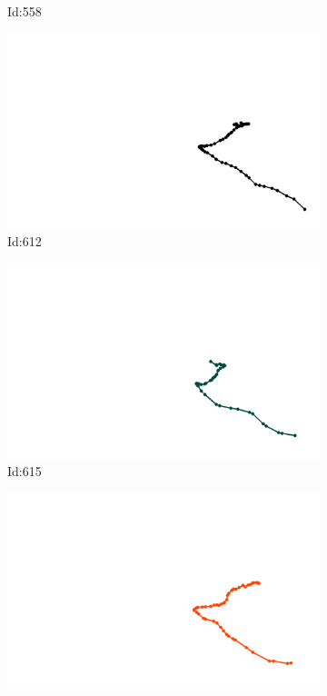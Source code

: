 \documentclass[12pt,twoside]{report}
\begin{document}
\begin{figure}
\begin{subfigure}[b]{0.20\textwidth}
\caption{Id:558}
\end{subfigure}
\begin{subfigure}[b]{0.20\textwidth}
\centering
\includegraphics[width=\textwidth]{../trajectories/612.png}
\caption{Id:612}
\end{subfigure}
\begin{subfigure}[b]{0.20\textwidth}
\centering
\includegraphics[width=\textwidth]{../trajectories/615.png}
\caption{Id:615}
\end{subfigure}
\begin{subfigure}[b]{0.20\textwidth}
\centering
\includegraphics[width=\textwidth]{../trajectories/625.png}

\end{subfigure}
\end{figure}
\end{document}
